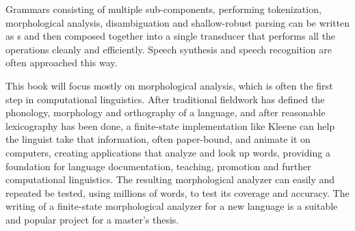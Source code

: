 Grammars consisting of multiple sub-components, performing tokenization, morphological
analysis, disambiguation and shallow-robust parsing can be written as \fst{}s and then
composed together into a single transducer that performs all the operations cleanly and
efficiently.  Speech synthesis and speech recognition are often approached this way.

This book will focus mostly on morphological analysis, which is often the first step in
computational linguistics.  After traditional fieldwork has defined the phonology,
morphology and orthography of a language, and after reasonable lexicography has been done,
a finite-state implementation like Kleene can help the linguist take that information, often paper-bound,
and animate it on
computers, creating
applications that analyze and look up words, providing a foundation for language
documentation, teaching, promotion and further computational linguistics.  The resulting
morphological analyzer can easily and repeated be tested, using millions of words, to
test its coverage and accuracy.  The writing of a finite-state
morphological
analyzer for a new language is a suitable and  popular project for a master's thesis.


